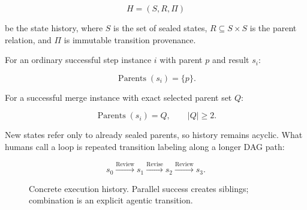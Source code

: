 \documentclass[11pt]{article}
\begin{document}
\begin{equation}
  H = (S,R,\Pi)
\end{equation}

be the state history, where \(S\) is the set of sealed states, \(R \subseteq S \times S\) is the parent relation, and \(\Pi\) is immutable transition provenance.

For an ordinary successful step instance \(i\) with parent \(p\) and result \(s_i\):

\begin{equation}
  \operatorname{Parents}(s_i)=\{p\}.
\end{equation}

For a successful merge instance with exact selected parent set \(Q\):

\begin{equation}
  \operatorname{Parents}(s_i)=Q, \qquad |Q|\geq 2.
\end{equation}

New states refer only to already sealed parents, so history remains acyclic. What humans call a loop is repeated transition labeling along a longer DAG path:

\begin{equation}
  s_0 \xrightarrow{\mathrm{Review}} s_1
      \xrightarrow{\mathrm{Revise}} s_2
      \xrightarrow{\mathrm{Review}} s_3.
\end{equation}

\begin{figure}[ht]
\centering
{}
\caption{Concrete execution history. Parallel success creates siblings; combination is an explicit agentic transition.}
\end{figure}
\end{document}
